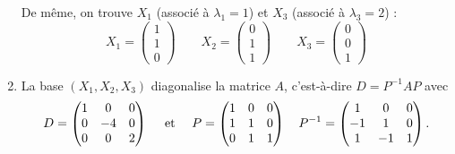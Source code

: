 \documentclass[11pt, class=report,crop=false]{standalone}
\begin{document}
\begin{exemple}
\begin{enumerate}
  
De même, on trouve $X_1$ (associé à $\lambda_1 = 1$) et $X_3$ (associé à $\lambda_3 = 2$) :
 $$
 X_1 = \begin{pmatrix}1\\1\\0\end{pmatrix}\qquad
 X_2 = \begin{pmatrix}0\\1\\1\end{pmatrix}\qquad 
 X_3 = \begin{pmatrix}0\\0\\1\end{pmatrix}$$
 
  \item  
 La base $(X_1, X_2,X_3)$ diagonalise la matrice $A$, c'est-à-dire
 $D = P^{-1}AP$ avec  
$$D=\begin{pmatrix}1&0&0\cr0&-4&0\cr0&0&2\end{pmatrix} \quad \text{ et  } \quad 
P=\begin{pmatrix}
1 & 0 & 0 \\
1 & 1 & 0 \\
0 & 1 & 1
\end{pmatrix}
\quad
P^{-1}=\begin{pmatrix}
1 & 0 & 0 \\
-1 & 1 & 0 \\
1 & -1 & 1
\end{pmatrix}
.$$    
\end{enumerate}  
\end{exemple}
\end{document}

